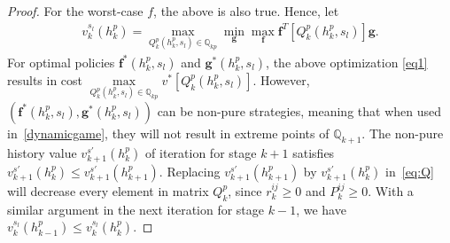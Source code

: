 \begin{proof}
For the worst-case $f$, the above is also true. Hence, let 
\begin{align}
\label{eq1}
v^{s_{l}}_{k}(h_{k}^{p})
=\max_{Q_{k}^{p}(h^{p}_{k},s_{l})\in \mathbb{Q}_{kp}} \min\limits_{\mathbf{g}}\max\limits_{\mathbf{f}}\mathbf{f}^T[Q_{k}^{p}(h^{p}_{k},s_{l})]\mathbf{g}.
\end{align}
For optimal policies $\mathbf{f}^{*}(h^{p}_{k},s_{l})$ and $\mathbf{g}^{*} (h^{p}_{k},s_{l})$, the above optimization \eqref{eq1} results in cost $\max\limits_{Q_{k}^{p}(h^{p}_{k},s_{l})\in \mathbb{Q}_{kp}}v^*[Q_{k}^{p}(h^{p}_{k},s_{l})]$. 
However, $(\mathbf{f}^{*}(h^{p}_{k},s_{l}),\mathbf{g}^{*}(h^{p}_{k},s_{l}))$ can be non-pure strategies, meaning that when used in~\ref{dynamicgame}, they will not result in extreme points of $\mathbb{Q}_{k+1}$. The non-pure history value $v_{k+1}^{s'}(h_{k}^{p})$ of iteration for stage $k+1$ satisfies %
$
v_{k+1}^{s'}(h_{k}^{p})\leq v_{k+1}^{s'}(h_{k+1}^{p}). 
$
Replacing $v_{k+1}^{s'}(h_{k+1}^{p})$ by $v_{k+1}^{s'}(h_{k}^{p})$ in~\eqref{eq:Q} will decrease every element in matrix $Q^{p}_{k}$, since $r_{k}^{ij}\geq0$ and $P_{k}^{ij}\geq 0$. %
With a similar argument in the next iteration for stage $k-1$, we have $v_{k}^{s_{l}}(h^{p}_{k-1})\leq v^{s_{l}}_{k}(h_{k}^{p})$. 
\end{proof}
